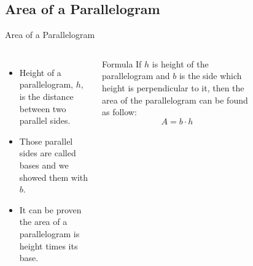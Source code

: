 \subsection{Area of a Parallelogram}
\begin{frame}{Area of a Parallelogram}
    \begin{columns}
    \begin{itemize}
        \item Height of a parallelogram, $h$, is the distance between two parallel sides.
        \item Those parallel sides are called bases and we showed them with $b$.
        \item It can be proven the area of a parallelogram is height times its base.
    \end{itemize}
    \begin{block}{Formula}
        If $h$ is height of the parallelogram and $b$ is the side which height is perpendicular to it, then the area of the parallelogram can be found as follow:
        \[ A = b \cdot h\] 
    \end{block}
    \begin{figure}[H]
        \centering
        
    \end{figure}
    \end{columns}
\end{frame}
